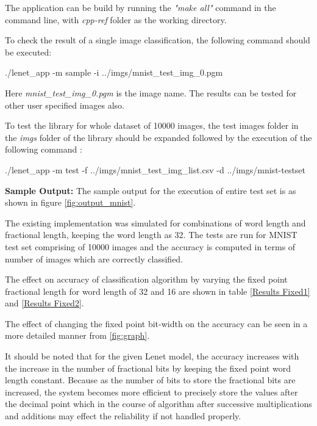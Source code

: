 
\noindent The application can be build by running the \textit{"make all"} command in the command line, with \textit{cpp-ref} folder as the working directory.

\vspace{0.25cm}
\noindent To check the result of a single image classification, the following command should be executed:

\vspace{0.25cm}
./lenet\_app -m sample -i ../imgs/mnist\_test\_img\_0.pgm

\vspace{0.25cm}
\noindent Here \textit{mnist\_test\_img\_0.pgm} is the image name. The results can be tested for other user specified images also.

\vspace{0.25cm}
\noindent To test the library for whole dataset of 10000 images, the test images folder in the \textit{imgs} folder of the library should be expanded followed by the execution of the following command :

\vspace{0.25cm}
./lenet\_app -m test -f ../imgs/mnist\_test\_img\_list.csv -d ../imgs/mnist-testset

\vspace{0.25cm}
\noindent \textbf{Sample Output:} The sample output for the execution of entire test set is as shown in figure \ref{fig:output_mnist}.


\noindent The existing implementation was simulated for combinations of word length and fractional length, keeping the word length as 32. The tests are run for MNIST test set comprising of 10000 images and the accuracy is computed in terms of number of images which are correctly classified.

\noindent The effect on accuracy of classification algorithm by varying the fixed point fractional length for word length of 32 and 16 are shown in table \ref{Results Fixed1} and \ref{Results Fixed2}.




\noindent The effect of changing the fixed point bit-width on the accuracy can be seen in a more detailed manner from \ref{fig:graph}.

\vspace{0.25cm}
\noindent It should be noted that for the given Lenet model, the accuracy increases with the increase in the number of fractional bits by keeping the fixed point word length constant. Because as the number of bits to store the fractional bits are increased, the system becomes more efficient to precisely store the values after the decimal point which in the course of algorithm after successive multiplications and additions may effect the reliability if not handled properly.

